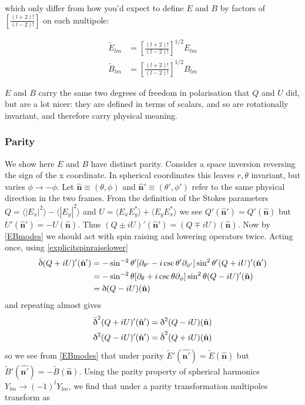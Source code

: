\documentclass[a4paper,10pt]{article}
\renewcommand{\v}[1]{\mathbf{#1}}
\newcommand{\unit}[1]{\hat{\v{#1}}}
\newcommand{\sr}{\text{\normalfont\dh}}
\renewcommand{\sl}{\bar{\text{\normalfont\dh}}}
\newcommand{\ltwo}{\left[\frac{(l+2)!}{(l-2)!}\right]}
\begin{document}
which only differ from how you'd expect to define $E$ and $B$ by factors of $\ltwo$ on each multipole: 

\begin{equation}\begin{split}
\tilde{E}_{lm}&=\ltwo^{1/2}E_{lm}\\
\tilde{B}_{lm}&=\ltwo^{1/2}B_{lm}
\label{EBtwiddle}
\end{split}\end{equation}

$E$ and $B$ carry the same two degrees of freedom in polarisation that $Q$ and $U$ did, but are a lot nicer: they are defined in terms of scalars, and so are rotationally invariant, and therefore carry physical meaning.

\subsubsection{Parity}

We show here $E$ and $B$ have distinct parity. Consider a space inversion reversing the sign of the x coordinate. In spherical coordinates this leaves $r, \theta$ invariant, but varies $\phi \rightarrow -\phi$.  Let $\unit{n}\equiv(\theta, \phi)$ and $\unit{n}'\equiv(\theta', \phi')$ refer to the same physical direction in the two frames. From the definition of the Stokes parameters $Q=\langle |E_x|^2 \rangle - \langle |E_y|^2 \rangle$ and $U = \langle E_xE_y^* \rangle + \langle E_yE_x^* \rangle$ we see $Q'(\unit{n}') = Q'(\unit{n})$ but $U'(\unit{n}') = -U(\unit{n})$. Thus $(Q\pm iU)'(\unit{n}') = (Q\mp iU)(\unit{n})$. Now by \ref{EBmodes} we should act with spin raising and lowering operators twice. Acting once, using \ref{explicitspinraiselower}
\begin{equation}\begin{split}
\sl(Q+iU)'(\unit{n}') &= -\sin^{-2}{\theta'}[\partial_{\theta'}-i\csc{\theta'}\partial_{\phi'}]\sin^{2}{\theta'}(Q+iU)'(\unit{n}')\\
&= -\sin^{-2}{\theta}[\partial_{\theta}+i\csc{\theta}\partial_{\phi}]\sin^{2}{\theta}(Q-iU)'(\unit{n})\\
&= \sr (Q-iU)(\unit{n})
\end{split}\end{equation}
and repeating almost gives 
\begin{equation}\begin{split}
\sl^2(Q+iU)'(\unit{n}') = \sr^2 (Q-iU)(\unit{n})\\
\sr^2(Q-iU)'(\unit{n}') = \sl^2 (Q+iU)(\unit{n})
\end{split}\end{equation}
so we see from \ref{EBmodes} that under parity $\tilde{E}'(\unit{n'})=\tilde{E}(\unit{n})$ but $\tilde{B}'(\unit{n'})=-\tilde{B}(\unit{n})$. Using the parity property of spherical harmonics $Y_{lm}\rightarrow(-1)^lY_{lm}$, we find that under a parity transformation multipoles transform as
\end{document}
